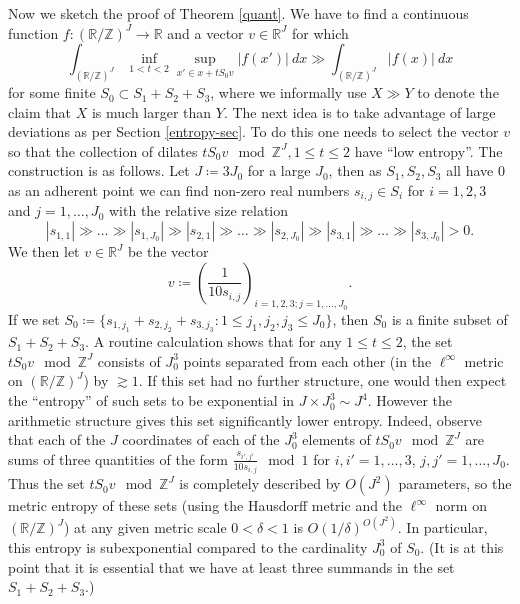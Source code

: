 \documentclass[12pt,a4paper,reqno]{amsart}
\numberwithin{equation}{section}
\theoremstyle{plain}
\theoremstyle{definition}
\newcommand\R{\mathbb{R}}
\newcommand\Z{\mathbb{Z}}
\begin{document}
Now we sketch the proof of Theorem \ref{quant}.  We have to find a continuous function $f: (\R/\Z)^J \to \R$ and a vector $v \in \R^J$ for which
$$ \int_{(\R/\Z)^J} \inf_{1 < t < 2} \sup_{x' \in x + tS_0 v} |f(x')|\ dx \gg \int_{(\R/\Z)^J} |f(x)|\ dx$$
for some finite $S_0 \subset S_1+S_2+S_3$, where we informally use $X \gg Y$ to denote the claim that $X$ is much larger than $Y$.  The next idea is to take advantage of large deviations as per Section \ref{entropy-sec}.  To do this one needs to select the vector $v$ so that the collection of dilates $tS_0 v \mod \Z^J, 1 \leq t \leq 2$ have ``low entropy''.  The construction is as follows. Let $J \coloneqq  3J_0$ for a large $J_0$, then as $S_1,S_2,S_3$ all have $0$ as an adherent point we can find non-zero real numbers $s_{i,j} \in S_i$ for $i=1,2,3$ and $j=1,\dots,J_0$ with the relative size relation
$$ |s_{1,1}| \gg \dots \gg |s_{1,J_0}| \gg |s_{2,1}| \gg \dots \gg |s_{2,J_0}| \gg |s_{3,1}| \gg \dots \gg |s_{3,J_0}| > 0.$$
We then let $v \in \R^J$ be the vector
$$ v \coloneqq \left(\frac{1}{10 s_{i,j}}\right)_{i=1,2,3; j=1,\dots,J_0}.$$
If we set $S_0 \coloneqq  \{ s_{1,j_1} + s_{2,j_2} + s_{3,j_3}: 1 \leq j_1,j_2,j_3 \leq J_0\}$, then $S_0$ is a finite subset of $S_1+S_2+S_3$.  A routine calculation shows that for any $1 \leq t \leq 2$, the set $t S_0 v \mod \Z^J$ consists of $J_0^3$ points separated from each other (in the $\ell^\infty$ metric on $(\R/\Z)^J$) by $\gtrsim 1$.  If this set had no further structure, one would then expect the ``entropy'' of such sets to be exponential in $J \times J_0^3 \sim J^4$.  However the arithmetic structure gives this set significantly lower entropy.  Indeed, observe that each of the $J$ coordinates of each of the $J_0^3$ elements of $t S_0 v \mod \Z^J$ are sums of three quantities of the form $\frac{s_{i',j'}}{10 s_{i,j}} \mod 1$ for $i,i'=1,\dots,3$, $j,j' = 1,\dots,J_0$.  Thus the set $t S_0 v \mod \Z^J$ is completely described by $O(J^2)$ parameters, so the metric entropy of these sets (using the Hausdorff metric and the $\ell^\infty$ norm on $(\R/\Z)^J$) at any given metric scale $0 < \delta < 1$ is $O(1/\delta)^{O(J^2)}$. In particular, this entropy is subexponential compared to the cardinality $J_0^3$ of $S_0$. (It is at this point that it is essential that we have at least three summands in the set $S_1+S_2+S_3$.)
\end{document}
